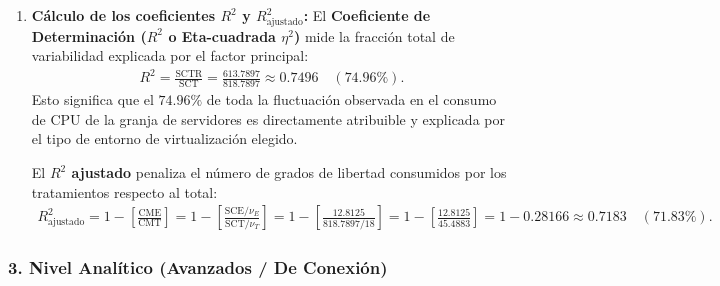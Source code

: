 \begin{solproblema}
\begin{enumerate}
		\item \textbf{Cálculo de los coeficientes $R^2$ y $R_{\text{ajustado}}^2$:}
		El \textbf{Coeficiente de Determinación ($R^2$ o Eta-cuadrada $\eta^2$)} mide la fracción total de variabilidad explicada por el factor principal:
		\begin{align}
			R^2 = \frac{\text{SCTR}}{\text{SCT}} = \frac{613.7897}{818.7897} \approx 0.7496 \quad (74.96\%).
		\end{align}
		Esto significa que el $74.96\%$ de toda la fluctuación observada en el consumo de CPU de la granja de servidores es directamente atribuible y explicada por el tipo de entorno de virtualización elegido.
		
		El \textbf{$R^2$ ajustado} penaliza el número de grados de libertad consumidos por los tratamientos respecto al total:
		\begin{align}
			R_{\text{ajustado}}^2 = 1 - \left[ \frac{\text{CME}}{\text{CMT}} \right] = 1 - \left[ \frac{\text{SCE}/\nu_E}{\text{SCT}/\nu_T} \right] = 1 - \left[ \frac{12.8125}{818.7897 / 18} \right] = 1 - \left[ \frac{12.8125}{45.4883} \right] = 1 - 0.28166 \approx 0.7183 \quad (71.83\%).
		\end{align}
	\end{enumerate}
\end{solproblema}

\subsubsection*{3. Nivel Analítico (Avanzados / De Conexión)}

